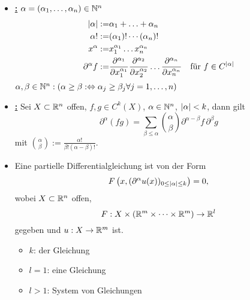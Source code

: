 \begin{itemize}

\item \underline{\textbf{:}} $\alpha=(\alpha_1,\ldots,\alpha_n)\in\mathbb{N}^n$
\begin{align*}
  \lvert \alpha\rvert := & \alpha_1+\ldots+\alpha_n \\
  \alpha! := & (\alpha_1)!\cdots (\alpha_n)! \\
  x^\alpha := & x_1^{\alpha_1}\ldots x_n^{\alpha_n} \\
  \partial^\alpha f := & \frac{\partial^{\alpha_1}}{\partial x_1^{\alpha_1}} \frac{\partial^{\alpha_2}}{\partial x_2^{\alpha_2}} \ldots \frac{\partial^{\alpha_n}}{\partial x_n^{\alpha_n}} \quad  \text{für } f\in C^{\lvert \alpha\rvert} \\
\end{align*}
$\alpha,\beta\in\mathbb{N}^n:(\alpha\geq\beta: \Leftrightarrow \alpha_j\geq\beta_j\forall j=1,\ldots,n)$

\item \underline{\textbf{:}} Sei $X\subset\mathbb{R}^n$ offen, $f,g\in C^k(X)$, $\alpha\in\mathbb{N}^n$, $\lvert \alpha\rvert <k$, dann gilt
\[ \partial^\alpha(fg)=\sum\limits_{\beta\leq\alpha} \binom{\alpha}{\beta}\partial^{\alpha-\beta}f \, \partial^\beta g \]
mit $\binom{\alpha}{\beta}:=\frac{\alpha!}{\beta!(\alpha-\beta)!}$.

\item Eine partielle Differentialgleichung ist von der Form
  \[ F\left(x, (\partial^\alpha u(x))_{0\leq\lvert \alpha\rvert\leq k}\right)=0, \]
  wobei $X\subset\mathbb{R}^n$ offen,
  \[ F:X\times(\mathbb{R}^m\times\cdots\times\mathbb{R}^m)\rightarrow\mathbb{R}^l \]
  gegeben und $u:X\rightarrow\mathbb{R}^m$ ist.
  \begin{itemize}
  \item $k$: \textbf{} der Gleichung
  \item $l=1$: eine Gleichung
  \item $l>1$: System von Gleichungen 
  \end{itemize}
\end{itemize}

